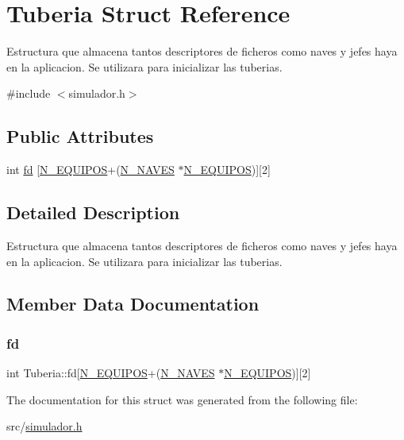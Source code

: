 \hypertarget{structTuberia}{}\section{Tuberia Struct Reference}
\label{structTuberia}


Estructura que almacena tantos descriptores de ficheros como naves y jefes haya en la aplicacion. Se utilizara para inicializar las tuberias.  




{\ttfamily \#include $<$simulador.\+h$>$}

\subsection*{Public Attributes}
\begin{DoxyCompactItemize}
\item 
int \hyperlink{structTuberia_a14d4d7d33931e74e35ce8291fe944159}{fd} \mbox{[}\hyperlink{simulador_8h_ab306668933fb4316ac0f5ef291d13dff}{N\+\_\+\+E\+Q\+U\+I\+P\+OS}+(\hyperlink{simulador_8h_aa1f2aba814c6d46772f9694849eeaa7a}{N\+\_\+\+N\+A\+V\+ES} $\ast$\hyperlink{simulador_8h_ab306668933fb4316ac0f5ef291d13dff}{N\+\_\+\+E\+Q\+U\+I\+P\+OS})\mbox{]}\mbox{[}2\mbox{]}
\end{DoxyCompactItemize}


\subsection{Detailed Description}
Estructura que almacena tantos descriptores de ficheros como naves y jefes haya en la aplicacion. Se utilizara para inicializar las tuberias. 

\subsection{Member Data Documentation}
\mbox{\label{structTuberia_a14d4d7d33931e74e35ce8291fe944159}} 
\subsubsection{\texorpdfstring{fd}{fd}}
{\footnotesize\ttfamily int Tuberia\+::fd\mbox{[}\hyperlink{simulador_8h_ab306668933fb4316ac0f5ef291d13dff}{N\+\_\+\+E\+Q\+U\+I\+P\+OS}+(\hyperlink{simulador_8h_aa1f2aba814c6d46772f9694849eeaa7a}{N\+\_\+\+N\+A\+V\+ES} $\ast$\hyperlink{simulador_8h_ab306668933fb4316ac0f5ef291d13dff}{N\+\_\+\+E\+Q\+U\+I\+P\+OS})\mbox{]}\mbox{[}2\mbox{]}}



The documentation for this struct was generated from the following file\+:\begin{DoxyCompactItemize}
\item 
src/\hyperlink{simulador_8h}{simulador.\+h}\end{DoxyCompactItemize}
